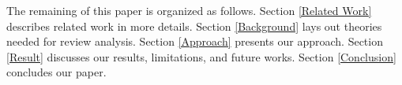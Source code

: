 
The remaining of this paper is organized as follows. Section \ref{Related Work} describes related work in more details. Section \ref{Background} lays out theories needed for review analysis. Section \ref{Approach} presents our approach. Section \ref{Result} discusses our results, limitations, and future works. Section \ref{Conclusion} concludes our paper. 
